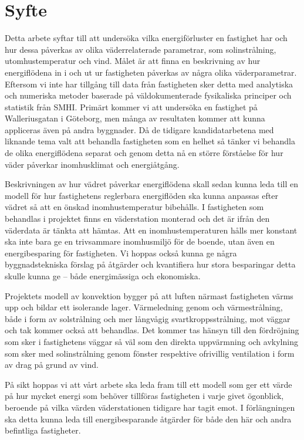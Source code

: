 \section{Syfte}
Detta arbete syftar till att undersöka vilka energiförluster en fastighet har och hur dessa 
påverkas av olika väderrelaterade parametrar, som solinstrålning, utomhustemperatur 
och vind. Målet är att finna en beskrivning av hur energiflödena in i och ut ur 
fastigheten påverkas av några olika väderparametrar. Eftersom vi inte har tillgång till data
 från fastigheten sker detta med analytiska och numeriska metoder baserade på 
väldokumenterade fysikaliska principer och statistik från SMHI. Primärt kommer vi att 
undersöka en fastighet på Walleriusgatan i Göteborg, men många av resultaten kommer 
att kunna appliceras även på andra byggnader. Då de tidigare kandidatarbetena med liknande tema valt att
behandla fastigheten som en helhet så tänker vi behandla de olika energiflödena separat
och genom detta nå en större förståelse för hur väder påverkar inomhusklimat och energiåtgång.

Beskrivningen av hur vädret påverkar energiflödena skall sedan kunna leda till en modell 
för hur fastighetens reglerbara energiflöden ska kunna anpassas efter vädret så att en 
önskad inomhustemperatur bibehålls. I fastigheten som behandlas i projektet finns
 en väderstation monterad och det är ifrån den väderdata är tänkta att hämtas. Att en inomhustemperaturen hålls mer konstant ska 
 inte bara ge en trivsammare inomhusmiljö för de boende, utan även en energibesparing 
 för fastigheten. Vi hoppas också kunna ge några byggnadstekniska förslag på åtgärder 
 och kvantifiera hur stora besparingar detta skulle kunna ge – både energimässiga och 
 ekonomiska.

Projektets modell av konvektion bygger på att luften närmast fastigheten värms upp och 
bildar ett isolerande lager. Värmeledning genom och värmestrålning, både i form av solstrålning och mer långvågig svartkroppsstrålning, mot väggar och tak kommer också att behandlas. Det kommer tas hänsyn till den fördröjning som 
sker i fastighetens väggar så väl som den direkta uppvärmning och avkylning som sker med 
solinstrålning genom fönster respektive ofrivillig ventilation i form av drag på grund av vind.

På sikt hoppas vi att vårt arbete ska leda fram till ett modell som ger ett värde på hur mycket energi som behöver tillföras fastigheten i varje givet ögonblick, beroende på vilka värden väderstationen tidigare har tagit emot. I förlängningen ska detta kunna leda till energibesparande åtgärder för både den här och andra befintliga fastigheter.

